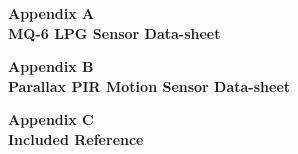 \documentclass[letter,twocolumn]{report}
\begin{document}
	
	\onecolumn
	\printbibliography		

	\begin{appendices}
		\begin{center}
			\textbf{\vspace{0.35\textheight}\Huge Appendix A\label{mq6:MDS} \\MQ-6 LPG Sensor Data-sheet}
			\newpage	
		\end{center}

		
		
		\begin{center}
			\textbf{\vspace{0.35\textheight}\Huge Appendix B\label{PIR:MDS} \\Parallax PIR Motion Sensor Data-sheet}
			\newpage
		\end{center}
		

		\begin{center}
			\textbf{\vspace{0.35\textheight}\Huge Appendix C\label{refs} \\Included Reference}
			\newpage
		\end{center}
	
	\end{appendices}	
\end{document}

